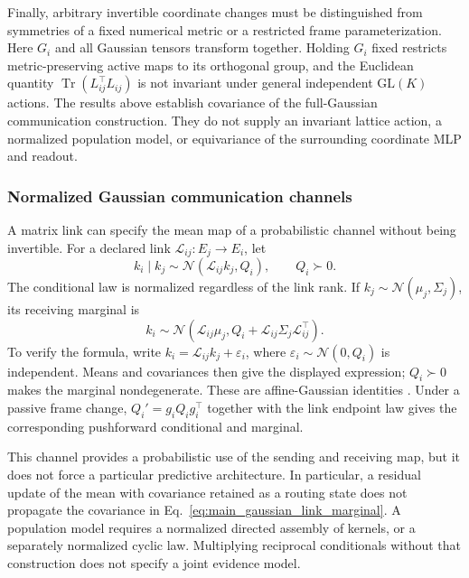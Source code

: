 \documentclass[twoside,11pt]{article}
\begin{document}
Finally, arbitrary invertible coordinate changes must be distinguished from symmetries of a fixed numerical metric or a restricted frame parameterization. Here $G_i$ and all Gaussian tensors transform together. Holding $G_i$ fixed restricts metric-preserving active maps to its orthogonal group, and the Euclidean quantity $\operatorname{Tr}(L_{ij}^\top L_{ij})$ is not invariant under general independent $\mathrm{GL}(K)$ actions. The results above establish covariance of the full-Gaussian communication construction. They do not supply an invariant lattice action, a normalized population model, or equivariance of the surrounding coordinate MLP and readout.

\subsubsection{Normalized Gaussian communication channels}
\label{sec:gaussian_link_channels}

A matrix link can specify the mean map of a probabilistic channel without being invertible. For a declared link \(\mathcal L_{ij}:E_j\to E_i\), let
\begin{equation}
k_i\mid k_j\sim\mathcal N(\mathcal L_{ij}k_j,Q_i),
\qquad Q_i\succ0.
\label{eq:main_gaussian_link_kernel}
\end{equation}
The conditional law is normalized regardless of the link rank. If \(k_j\sim\mathcal N(\mu_j,\Sigma_j)\), its receiving marginal is
\begin{equation}
k_i\sim\mathcal N\left(
\mathcal L_{ij}\mu_j,
Q_i+\mathcal L_{ij}\Sigma_j\mathcal L_{ij}^{\top}\right).
\label{eq:main_gaussian_link_marginal}
\end{equation}
To verify the formula, write \(k_i=\mathcal L_{ij}k_j+\varepsilon_i\), where \(\varepsilon_i\sim\mathcal N(0,Q_i)\) is independent. Means and covariances then give the displayed expression; \(Q_i\succ0\) makes the marginal nondegenerate. These are affine-Gaussian identities \citep{Bishop2006}. Under a passive frame change, \(Q_i'=g_iQ_ig_i^\top\) together with the link endpoint law gives the corresponding pushforward conditional and marginal.

This channel provides a probabilistic use of the sending and receiving map, but it does not force a particular predictive architecture. In particular, a residual update of the mean with covariance retained as a routing state does not propagate the covariance in Eq.~\eqref{eq:main_gaussian_link_marginal}. A population model requires a normalized directed assembly of kernels, or a separately normalized cyclic law. Multiplying reciprocal conditionals without that construction does not specify a joint evidence model.
\end{document}
